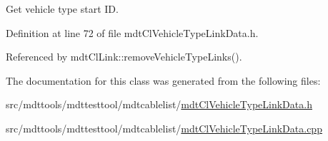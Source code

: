 Get vehicle type start I\-D. 



Definition at line 72 of file mdt\-Cl\-Vehicle\-Type\-Link\-Data.\-h.



Referenced by mdt\-Cl\-Link\-::remove\-Vehicle\-Type\-Links().



The documentation for this class was generated from the following files\-:\begin{DoxyCompactItemize}
\item 
src/mdttools/mdttesttool/mdtcablelist/\hyperlink{mdt_cl_vehicle_type_link_data_8h}{mdt\-Cl\-Vehicle\-Type\-Link\-Data.\-h}\item 
src/mdttools/mdttesttool/mdtcablelist/\hyperlink{mdt_cl_vehicle_type_link_data_8cpp}{mdt\-Cl\-Vehicle\-Type\-Link\-Data.\-cpp}\end{DoxyCompactItemize}

